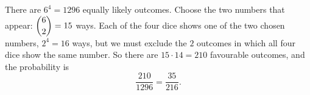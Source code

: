 There are $6^4=1296$ equally likely outcomes. Choose the two numbers that appear: $\dbinom62=15$ ways. Each of the four dice shows one of the two chosen numbers, $2^4=16$ ways, but we must exclude the $2$ outcomes in which all four dice show the same number. So there are $15\cdot14=210$ favourable outcomes, and the probability is
\[
\dfrac{210}{1296}=\boxed{\dfrac{35}{216}}.
\]
